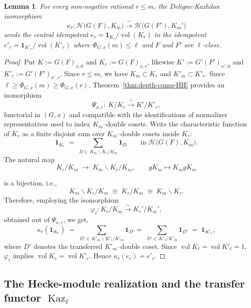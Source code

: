 \documentclass[american]{article}
\numberwithin{equation}{section}
\numberwithin{figure}{section}
\theoremstyle{plain}
\newtheorem{lemma}[theorem]{Lemma}
\theoremstyle{definition}
\theoremstyle{remark}
\DeclareMathOperator{\vol}{vol}
\DeclareMathOperator{\Kaz}{Kaz}
\newcommand{\cH}{\mathcal{H}}
\begin{document}
\begin{lemma}
\label{lem:idempotents-transport}
For every non-negative rational $r\leq m$, the Deligne-Kazhdan isomorphism
\[
\kappa_{\ell} : \cH\!\bigl(G(F),K_m\bigr) \xrightarrow{\;\sim\;} \cH\!\bigl(G(F'),K_m'\bigr)
\]
sends the central idempotent $e_{r}=\mathbf{1}_{K_{r}}/\!\vol(K_{r})$ to the idempotent $e'_{r}=\mathbf{1}_{K'_{r}}/\!\vol(K'_{r})$ where \(\Phi_{G,x}(m)\leq \ell\) and $F$ and $F'$ are $\ell$-close.
\end{lemma}

\begin{proof}
Put $K:=G(F)_{x,0}$ and $K_r:=G(F)_{x,r}$, likewise $K':=G'(F')_{x',0}$ and $K'_r:=G'(F')_{x',r}$.
Since $r\le m$, we have $K_m\subset K_r$ and $K'_m\subset K'_r$. Since $\ell\ge \Phi_{G,x}(m)\ge \Phi_{G,x}(r)$, Theorem~\ref{thm:depth-comp-HH} provides an isomorphism
\[
\Psi_{x,r}:\ K/K_r \xrightarrow{\ \sim\ } K'/K'_r,
\]
functorial in $(G,x)$ and compatible with the identifications of normalizer
representatives used to index $K_m$--double cosets.
\smallskip
Write the characteristic function of $K_r$ as a finite disjoint sum over
$K_m$--double cosets inside $K_r$:
\[
\mathbf{1}_{K_r}\;=\;\sum_{D\in\,K_m\backslash K_r/K_m} \mathbf{1}_D
\qquad\text{in }\cH\!\bigl(G(F),K_m\bigr).
\]
The natural map
\[
K_r/K_m \;\longrightarrow\; K_m\backslash K_r/K_m,\qquad gK_m\mapsto K_m g K_m
\]

is a bijection, i.e.,
\[
K_m\backslash K_r/K_m \;\cong\; K_r/K_m \;\cong\; K_m\backslash K_r.
\]
Therefore, employing the isomorphism 
\[
\varphi_\ell: K_r / K_m \xrightarrow{\sim} K_r' / K_m' ,
\]
obtained out of \(\Psi_{x,r}\), we get,
\[
\kappa_\ell\!\left(\mathbf{1}_{K_r}\right)
\;=\;\sum_{D'\in\,K'_m\backslash K'_r/K'_m} \mathbf{1}_{D'}=\;\sum_{D'\in\,K'_r/K'_m} \mathbf{1}_{D'}
\;=\;\mathbf{1}_{K'_r},
\]
where $D'$ denotes the transferred $K'_m$--double coset.
Since $\vol K_{\ell}=\vol K'_{\ell}=1$, $\varphi_\ell$ implies $\vol K_{r}=\vol K'_{r}$. Hence $\kappa_\ell(e_r)=e'_r$.

\end{proof}

\subsection{The Hecke-module realization and the transfer functor $\Kaz_{\ell}$}\label{sec:def-Kaz}
\end{document}
